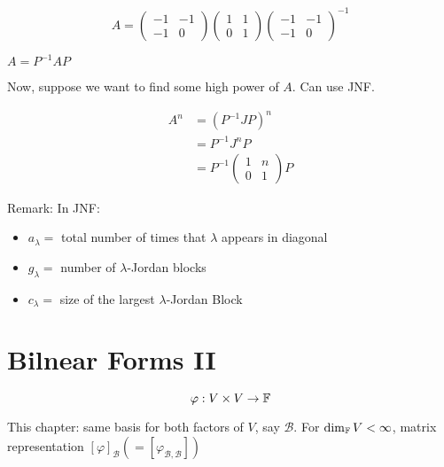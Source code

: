 \documentclass[a4paper]{article}
\begin{document}
\begin{eg}
\begin{itemize}
		
		\[ A = \begin{pmatrix}
		-1 & -1 \\
		-1 & 0
		\end{pmatrix}  \begin{pmatrix}
		1 & 1 \\
		0 & 1
		\end{pmatrix} \begin{pmatrix}
		-1 & -1 \\
		-1 & 0
		\end{pmatrix}^{-1} \]
		
		$ A = P^{-1} A P $
		
		
		
	\end{itemize}



Now, suppose we want to find some high power of $ A $. Can use JNF.

\begin{align*}
A^{n} & = ( P^{-1} J P )^{n} \\
& = P^{-1} J^{n} P \\
& = P^{-1} \begin{pmatrix}
1 & n \\
0 & 1
\end{pmatrix} P 
\end{align*}




	
\end{eg}


Remark: In JNF:

\begin{itemize}
	\item $ a_{\lambda} =  $ total number of times that $ \lambda $ appears in diagonal
	\item $ g_{\lambda} = $ number of $ \lambda $-Jordan blocks
	\item $ c_{\lambda} =  $ size of the largest $ \lambda $-Jordan Block
\end{itemize}


\section{Bilnear Forms II}

\[ \varphi : V \times V \to \mathbb{F} \]

This chapter: same basis for both factors of $ V $, say $ \mathcal{B} $. For $ \dim_{\mathbb{F}} V < \infty $, matrix representation $ [ \varphi ]_{\mathcal{B}} ( = [  \varphi_{\mathcal{B},\mathcal{B}} ] ) $
\end{document}
